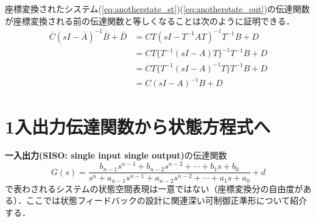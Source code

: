 座標変換されたシステム(\ref{eq:anotherstate_st})(\ref{eq:anotherstate_out})の伝達関数が座標変換される前の伝達関数と等しくなることは次のように証明できる．
\begin{align}
 \bar{C} (sI - \bar{A})^{-1} \bar{B} + \bar{D} 
 &= CT (sI - T^{-1} A T )^{-1} T^{-1} B + D
\nonumber\\
 &= C T \{ T^{-1} (sI - A) T \}^{-1} T^{-1} B + D
\nonumber\\
 &= C T \{ T^{-1} (sI - A)^{-1} T \} T^{-1} B + D
\nonumber \\
 &= C (sI - A)^{-1} B + D
\end{align}



\section{1入出力伝達関数から状態方程式へ \label{sec_canonical}}

{\bf {一入出力}(SISO: single input single output)}の伝達関数
\begin{equation}
 G(s) =
  \frac{b_{n-1} s^{n-1} + b_{n-2} s^{n-2} + \cdots + b_1 s + b_0}
  {s^n + a_{n-1} s^{n-1} + a_{n-2} s^{n-2} + \cdots + a_1 s + a_0}
  + d
  \label{eq:G(s)}
\end{equation}
で表わされるシステムの状態空間表現は一意ではない（座標変換分の自由度がある）．ここでは状態フィードバックの設計に関連深い可制御正準形について紹介する．

